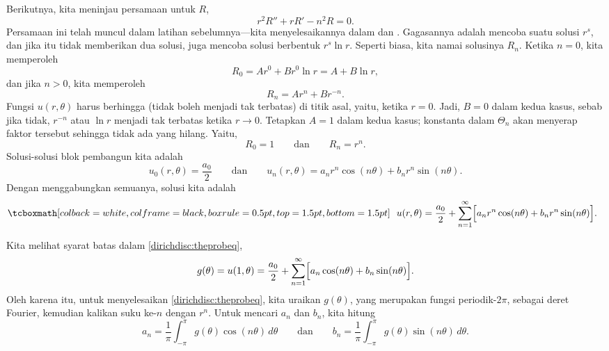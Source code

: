 Berikutnya, kita meninjau persamaan untuk $R$,
\begin{equation*}
r^2 R'' + r R' - n^2 R = 0.
\end{equation*}
Persamaan ini telah muncul dalam latihan sebelumnya---kita
menyelesaikannya dalam 
dan .  Gagasannya adalah mencoba suatu solusi
$r^s$, dan jika itu tidak memberikan dua solusi, juga mencoba solusi berbentuk
$r^s \ln r$.  Seperti biasa, kita namai solusinya $R_n$.  Ketika $n=0$, kita memperoleh
\begin{equation*}
R_0 = A r^0 + B r^0 \ln r = A + B \ln r ,
\end{equation*}
dan jika $n > 0$, kita memperoleh
\begin{equation*}
R_n = A r^n + B r^{-n} .
\end{equation*}
Fungsi $u(r,\theta)$ harus berhingga (tidak boleh menjadi tak terbatas) di titik asal, yaitu, ketika $r=0$.
Jadi, $B=0$ dalam kedua
kasus, sebab jika tidak, $r^{-n}$ atau $\ln r$ menjadi tak terbatas ketika $r\to 0$.
Tetapkan $A=1$ dalam kedua kasus; konstanta dalam $\Theta_n$
akan menyerap faktor tersebut sehingga tidak ada yang hilang.  Yaitu,
\begin{equation*}
R_0 = 1
\qquad \text{dan} \qquad
R_n = r^n .
\end{equation*}
Solusi-solusi blok pembangun kita adalah
\begin{equation*}
u_0(r,\theta) = \frac{a_0}{2}
\qquad \text{dan} \qquad
u_n(r,\theta) = a_n r^n \cos(n \theta) + b_n r^n \sin(n \theta) .
\end{equation*}
Dengan menggabungkan semuanya, solusi kita adalah
\begin{equation*}
\mybxbg{~~
u(r,\theta)
=
\frac{a_0}{2} +
\sum_{n=1}^\infty
\Bigl[
a_n r^n \cos(n \theta) + b_n r^n \sin(n \theta)
\Bigr]
.
~~}
\end{equation*}

Kita melihat syarat batas dalam \eqref{dirichdisc:theprobeq},
\begin{equation*}
g(\theta) = u(1,\theta)
=
\frac{a_0}{2} +
\sum_{n=1}^\infty
\Bigl[
a_n \cos(n \theta) + b_n \sin(n \theta)
\Bigr].
\end{equation*}
Oleh karena itu, untuk menyelesaikan \eqref{dirichdisc:theprobeq},
kita uraikan $g(\theta)$, yang merupakan
fungsi periodik-$2\pi$, sebagai deret Fourier, kemudian
kalikan suku ke-$n$ dengan $r^n$.  Untuk
mencari $a_n$ dan $b_n$, kita hitung
\begin{equation*}
a_n =
\frac{1}{\pi} \int_{-\pi}^\pi g(\theta) \cos (n\theta) \, d\theta \qquad
\text{dan} \qquad
b_n =
\frac{1}{\pi} \int_{-\pi}^\pi g(\theta) \sin (n\theta) \, d\theta.
\end{equation*}

